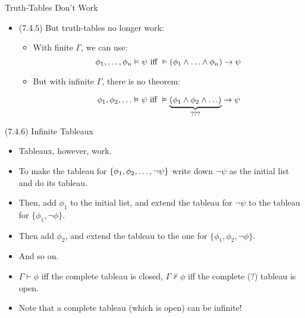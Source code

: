 \begin{frame}{Truth-Tables Don't Work}
	
	\begin{itemize}
	
		\item (7.4.5) But truth-tables no longer work:
		
			\begin{itemize}
			
				\item With finite $\Gamma$, we can use: \[\phi_1,\mathellipsis, \phi_n\vDash \psi\text{ iff }\vDash (\phi_1\land\mathellipsis\land\phi_n)\to\psi\]
				
				\item But with infinite $\Gamma$, there is no theorem:
				
				\[\phi_1,\phi_2,\mathellipsis\vDash \psi\text{ iff }\vDash \underbrace{(\phi_1\land\phi_2\land\mathellipsis)}_{???}\to\psi\]
			
			\end{itemize}
	
	\end{itemize}

\end{frame}

\begin{frame}{(7.4.6) Infinite Tableaux}

	\begin{itemize}
	
		\item  Tableaux, however, work.
		
		\item To make the tableau for $\{\phi_1,\phi_2,\mathellipsis,\neg\psi\}$ write down $\neg \psi$ as the initial list and do its tableau.
		
		\item Then, add $\phi_1$ to the initial list, and extend the tableau for $\neg\psi$ to the tableau for $\{\phi_1,\neg\phi\}$.
		
		\item Then add $\phi_2$, and extend the tableau to the one for $\{\phi_1,\phi_2,\neg\phi\}$.
		
		\item And so on.
		
		\item $\Gamma\vdash\phi$ iff the complete tableau is closed, $\Gamma\nvdash\phi$ iff the complete (?) tableau is open.
		
		\item Note that a complete tableau (which is open) can be infinite!
	
	\end{itemize}

\end{frame}


